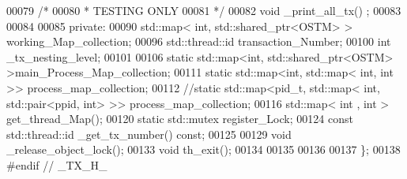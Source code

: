 \begin{DoxyCode}
00079     \textcolor{comment}{/*}
00080 \textcolor{comment}{     * TESTING ONLY}
00081 \textcolor{comment}{     */}
00082     \textcolor{keywordtype}{void} \_print\_all\_tx() ;
00083 
00084 
00085 \textcolor{keyword}{private}:
00090     std::map< int, std::shared\_ptr<OSTM>  > working\_Map\_collection;
00096     std::thread::id transaction\_Number;
00100     \textcolor{keywordtype}{int} \_tx\_nesting\_level;
00101     
00106     \textcolor{keyword}{static} std::map<int, std::shared\_ptr<OSTM>  >main\_Process\_Map\_collection;
00111     \textcolor{keyword}{static} std::map<int, std::map< int, int >> process\_map\_collection;
00112     \textcolor{comment}{//static std::map<pid\_t, std::map< int, std::pair<ppid, int>  >> process\_map\_collection;}
00116 \textcolor{comment}{}    std::map< int , int > get\_thread\_Map();
00120     \textcolor{keyword}{static} std::mutex register\_Lock;
00124     \textcolor{keyword}{const} std::thread::id \_get\_tx\_number() \textcolor{keyword}{const};
00125    
00129     \textcolor{keywordtype}{void} \_release\_object\_lock();
00133     \textcolor{keywordtype}{void} th\_exit();
00134     
00135     
00136 
00137 \};
00138 \textcolor{preprocessor}{#endif // \_TX\_H\_}
\end{DoxyCode}
